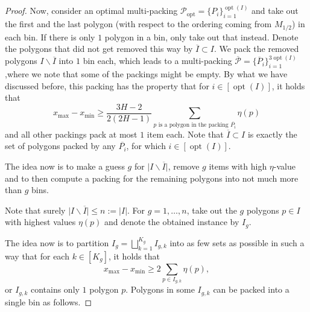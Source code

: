 \documentclass[a4paper,UKenglish,cleveref, autoref, thm-restate]{lipics_v2021}
\DeclareMathOperator{\opt}{opt}
\begin{document}
\begin{proof}
Now, consider an optimal multi-packing $\mathcal{P}_{\opt}=\{P_i\}_{i=1}^{\opt(I)}$ and take out the first and the last polygon (with respect to the ordering coming from $M_{1/2}$) in each bin. If there is only $1$ polygon in a bin, only take out that instead. Denote the polygons that did not get removed this way by $\overline{I} \subset I$.  We pack the removed polygons $I \backslash \overline{I}$ into $1$ bin each, which leads to a multi-packing $\overline{\mathcal{P}}=\{\overline{P}_i\}_{i=1}^{3 \opt(I)}$,where we note that some of the packings might be empty. By what we have discussed before, this packing has the property that for $i \in [\opt(I)]$, it holds that
\begin{equation}
\label{eq_upper_bounding_polygons}
x_{\max}-x_{\min} \geq \frac{3H-2}{2(2H-1)}\sum_{p \text{ is a polygon in the packing } \overline{P_i}} \eta(p)
\end{equation}
and all other packings pack at most $1$ item each. Note that $\overline{I} \subset I$ is exactly the set of polygons packed by any $\overline{P_i}$, for which $i \in [\opt(I)]$.

The idea now is to make a guess $g$ for $\lvert I \backslash \overline{I} \rvert$, remove $g$ items with high $\eta$-value and to then compute a packing for the remaining polygons into not much more than $g$ bins.

Note that surely $\lvert I \backslash \overline{I} \rvert \leq n := \lvert I \rvert$. For $g=1, \dots, n$, take out the $g$ polygons $p \in I$ with highest values $\eta(p)$ and denote the obtained instance by $I_g$.

The idea now is to partition $I_g = \bigsqcup_{k=1}^{K_g} I_{g,k}$ into as few sets as possible in such a way that for each $k \in [K_g]$, it holds that
\begin{equation}
    \label{eq_what_partition_should_do}
    x_{\max}-x_{\min} \geq 2 \sum_{p \in I_{g,k}} \eta(p),
\end{equation}
or $I_{g,k}$ contains only $1$ polygon $p$. Polygons in some $I_{g,k}$ can be packed into a single bin as follows.


\end{proof}
\end{document}
